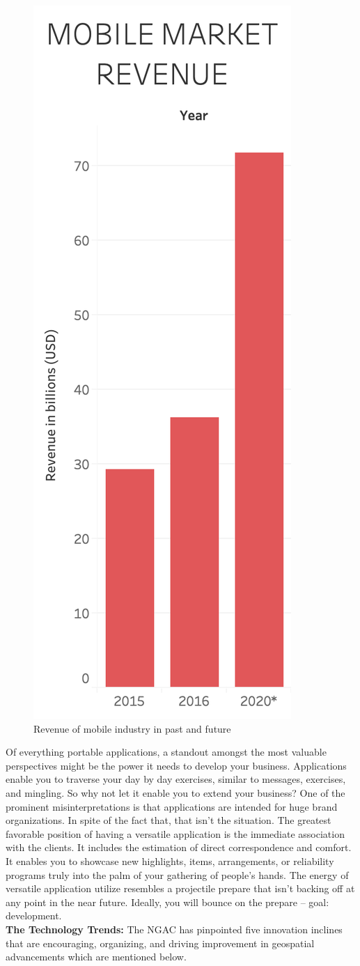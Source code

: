     \begin{figure}[H]
            \centering
            \includegraphics[width=0.25\linewidth]{figures/ch1/future_work_growth.png}
            \caption{\label{fig:future_work_distribution} Revenue of mobile industry in past and future \cite{eBiz_solutions}}
    \end{figure}

Of everything portable applications, a standout amongst the most valuable perspectives might be the power it needs to develop your business. Applications enable you to traverse your day by day exercises, similar to messages, exercises, and mingling. So why not let it enable you to extend your business? One of the prominent misinterpretations is that applications are intended for huge brand organizations. In spite of the fact that, that isn't the situation. The greatest favorable position of having a versatile application is the immediate association with the clients. It includes the estimation of direct correspondence and comfort. It enables you to showcase new highlights, items, arrangements, or reliability programs truly into the palm of your gathering of people's hands. The energy of versatile application utilize resembles a projectile prepare that isn't backing off at any point in the near future. Ideally, you will bounce on the prepare – goal: development. \\

\textbf{The Technology Trends:} The NGAC has pinpointed five innovation inclines that are encouraging, organizing, and driving improvement in geospatial advancements which are mentioned below. 

